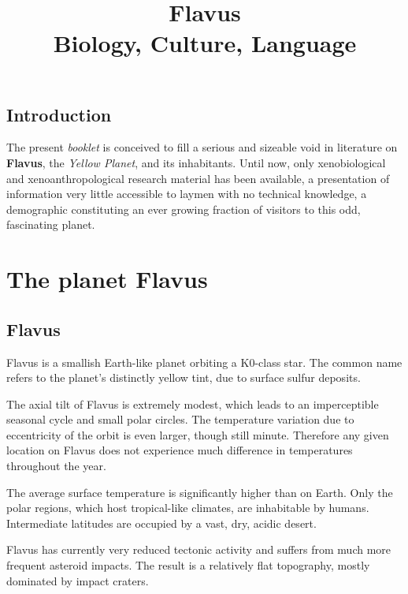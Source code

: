 \documentclass[10pt,oneside]{memoir}
\title{Flavus\\\large Biology, Culture, Language}
\begin{document}
\maketitle

\pagebreak

\section{Introduction}

The present \emph{booklet} is conceived to fill a serious and sizeable void in literature on \textbf{Flavus}, the \emph{Yellow Planet}, and its inhabitants. Until now, only xenobiological and xenoanthropological research material has been available, a presentation of information very little accessible to laymen with no technical knowledge, a demographic constituting an ever growing fraction of visitors to this odd, fascinating planet.


\tableofcontents

\chapter{The planet Flavus}

\section{Flavus}

Flavus is a smallish Earth-like planet orbiting a K0-class star. The common name refers to the planet's distinctly yellow tint, due to surface sulfur deposits.

The axial tilt of Flavus is extremely modest, which leads to an imperceptible seasonal cycle and small polar circles. The temperature variation due to eccentricity of the orbit is even larger, though still minute. Therefore any given location on Flavus does not experience much difference in temperatures throughout the year.

The average surface temperature is significantly higher than on Earth. Only the polar regions, which host tropical-like climates, are inhabitable by humans. Intermediate latitudes are occupied by a vast, dry, acidic desert.

Flavus has currently very reduced tectonic activity and suffers from much more frequent asteroid impacts. The result is a relatively flat topography, mostly dominated by impact craters.
\end{document}
